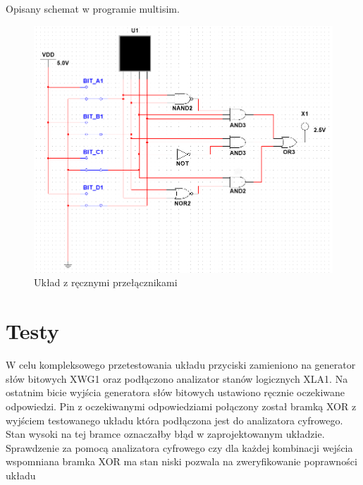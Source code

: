 \documentclass[12pt,a4paper,openright]{mwrep}
\begin{document}
Opisany schemat w programie multisim.
\begin{figure}[H]
    \centering
    \includegraphics[width=1\textwidth]{images/1b_schema_1.PNG}
    \caption{Układ z ręcznymi przełącznikami}
    \label{rys:1b_usable_circuit}
\end{figure}

\section{Testy}
W celu kompleksowego przetestowania układu przyciski zamieniono na generator słów bitowych XWG1 
oraz podłączono analizator stanów logicznych XLA1. Na ostatnim bicie wyjścia generatora słów bitowych ustawiono
ręcznie oczekiwane odpowiedzi. Pin z oczekiwanymi odpowiedziami połączony został bramką XOR z wyjściem testowanego
układu która podłączona jest do analizatora cyfrowego. Stan wysoki na tej bramce oznaczałby błąd w zaprojektowanym układzie.
Sprawdzenie za pomocą analizatora cyfrowego czy dla każdej kombinacji wejścia wspomniana bramka XOR ma stan niski pozwala na
zweryfikowanie poprawności układu
\end{document}
